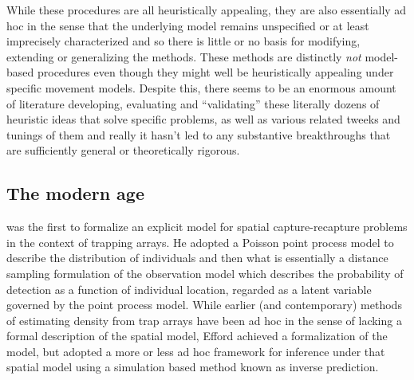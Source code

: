 While these procedures are all heuristically appealing, they are also
essentially ad hoc in the sense that the underlying model remains
unspecified or at least imprecisely characterized and so there is
little or no basis for modifying, extending or generalizing the
methods. These methods are distinctly {\it not} model-based procedures
even though they might well be heuristically appealing under specific
movement models. Despite this, there seems to be an enormous amount of
literature developing, evaluating and ``validating'' these literally
dozens of heuristic ideas that solve specific problems, as well as
various related tweeks and tunings of them and really it hasn't led to
any substantive breakthroughs that are sufficiently general or
theoretically rigorous.


\subsection{The modern age}

\citet{efford:2004} was the first to formalize an explicit model for
spatial capture-recapture problems in the context of trapping arrays.
He adopted a Poisson point process model to describe the distribution
of individuals and then what is essentially a distance sampling
formulation of the observation model which describes the probability
of detection as a function of individual location, regarded as a
latent variable governed by the point process model. While earlier
(and contemporary) methods of estimating density from trap arrays have
been ad hoc in the sense of lacking a formal description of the
spatial model, Efford achieved a formalization of the model, but
adopted a more or less ad hoc framework for inference under that
spatial model using a simulation based method known as inverse
prediction.


